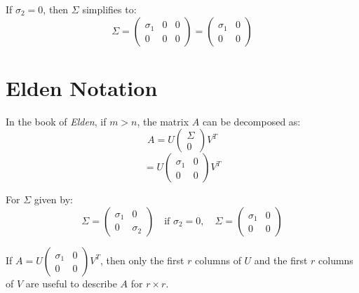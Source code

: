 If $\sigma_2 = 0$, then $\Sigma$ simplifies to:
\[
\Sigma = \begin{pmatrix}
\sigma_1 & 0 & 0 \\
0 & 0 & 0
\end{pmatrix} = \begin{pmatrix}
\sigma_1 & 0 \\
0 & 0
\end{pmatrix}
\]

\section*{Elden Notation}
In the book of \textit{Elden}, if $m > n$, the matrix $A$ can be decomposed as:
\[
A = U \begin{pmatrix}
\Sigma \\
0
\end{pmatrix} V^T
\]
\[
= U \begin{pmatrix}
\sigma_1 & 0 \\
0 & 0
\end{pmatrix} V^T
\]

For $\Sigma$ given by:
\[
\Sigma = \begin{pmatrix}
\sigma_1 & 0 \\
0 & \sigma_2
\end{pmatrix} \quad \text{if } \sigma_2 = 0, \quad \Sigma = \begin{pmatrix}
\sigma_1 & 0 \\
0 & 0
\end{pmatrix}
\]

If $A = U \begin{pmatrix}
\sigma_1 & 0 \\
0 & 0
\end{pmatrix} V^T$, then only the first $r$ columns of $U$ and the first $r$ columns of $V$ are useful to describe $A$ for $r \times r$.

